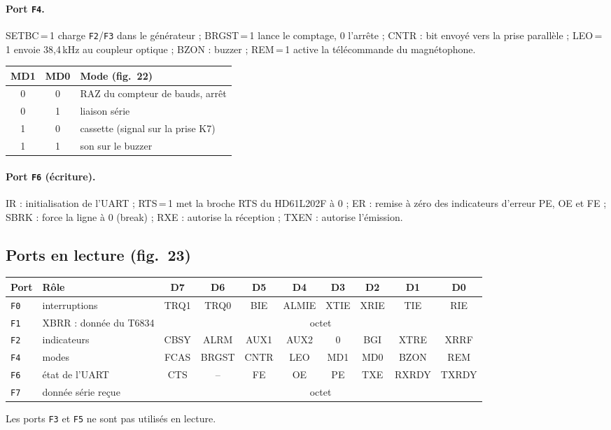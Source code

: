 \documentclass[a4paper,10pt]{article}
\newcommand{\hex}[1]{\texttt{#1}}
\begin{document}
\paragraph{Port \hex{F4}.} SETBC\,=\,1 charge \hex{F2}/\hex{F3} dans le
générateur ; BRGST\,=\,1 lance le comptage, 0 l'arrête ; CNTR : bit envoyé
vers la prise parallèle ; LEO\,=\,1 envoie 38,4\,kHz au coupleur optique ;
BZON : buzzer ; REM\,=\,1 active la télécommande du magnétophone.

\begin{center}\small
\begin{tabular}{@{}ccl@{}}
\toprule
MD1 & MD0 & Mode (fig.~22) \\
\midrule
0 & 0 & RAZ du compteur de bauds, arrêt \\
0 & 1 & liaison série \\
1 & 0 & cassette (signal sur la prise K7) \\
1 & 1 & son sur le buzzer \\
\bottomrule
\end{tabular}
\end{center}

\paragraph{Port \hex{F6} (écriture).} IR : initialisation de l'UART ;
RTS\,=\,1 met la broche RTS du HD61L202F à 0 ; ER : remise à zéro des
indicateurs d'erreur PE, OE et FE ; SBRK : force la ligne à 0 (break) ;
RXE : autorise la réception ; TXEN : autorise l'émission.

\subsection{Ports en lecture (fig.~23)}
\begin{center}\small
\begin{tabular}{@{}l>{\raggedright}p{3.2cm}*{8}{c}@{}}
\toprule
Port & Rôle & D7 & D6 & D5 & D4 & D3 & D2 & D1 & D0 \\
\midrule
\hex{F0} & interruptions & TRQ1 & TRQ0 & BIE & ALMIE & XTIE & XRIE & TIE & RIE \\
\hex{F1} & XBRR : donnée du T6834 & \multicolumn{8}{c}{octet} \\
\hex{F2} & indicateurs & CBSY & ALRM & AUX1 & AUX2 & 0 & BGI & XTRE & XRRF \\
\hex{F4} & modes & FCAS & BRGST & CNTR & LEO & MD1 & MD0 & BZON & REM \\
\hex{F6} & état de l'UART & CTS & -- & FE & OE & PE & TXE & RXRDY & TXRDY \\
\hex{F7} & donnée série reçue & \multicolumn{8}{c}{octet} \\
\bottomrule
\end{tabular}
\end{center}
Les ports \hex{F3} et \hex{F5} ne sont pas utilisés en lecture.
\end{document}
